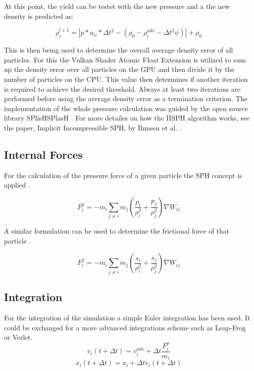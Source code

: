 \documentclass[intern]{cgMA}
\begin{document}
    At this point, the yield can be testet with the new pressure and a the new density is predicted as:

    \begin{equation}
        \rho_i^{l+1} = |p * a_{ii} * \Delta t^2 - (\rho_0 - \rho_i^{adv} - \Delta t^2 \psi)| + \rho_0
    \end{equation}

    This is then being used to determine the overall average density error of all particles. For this the Vulkan Shader Atomic Float Extension is utilized to sum up the density error over all particles on the GPU and then divide it by the number of particles on the CPU. This value then determines if another iteration is required to achieve the desired threshold. Always at least two iterations are performed before using the average density error as a termination criterion. The implementation of the whole pressure calculation was guided by the open source library SPlisHSPlasH \cite{splishsplash}. For more detailes on how the IISPH algorithm works, see the paper, Implicit Incompressible SPH, by Ihmsen et al. \cite{6570475}.

    \subsection{Internal Forces}
    
    For the calculation of the pressure force of a given particle the SPH concept is applied \cite{10.2312:PE:vriphys:vriphys12:053-060}. 

    \begin{equation}
        F_i^p = -m_i \sum_{j \neq i} m_j (\frac{p_i}{\rho_i^2} + \frac{p_j}{\rho_j^2})  \nabla W_{ij}
    \end{equation}
    
    A similar formulation can be used to determine the frictional force of that particle \cite{10.2312:PE:vriphys:vriphys12:053-060}.

    \begin{equation}
        F_i^f = -m_i \sum_{j \neq i} m_j (\frac{s_i}{\rho_i^2} + \frac{s_j}{\rho_j^2})  \nabla W_{ij}
    \end{equation}

    

    \subsection{Integration}
    For the integration of the simulation a simple Euler integration has been used. It could be exchanged for a more advanced integrations scheme such as Leap-Frog or Verlet.
    \begin{equation}
        v_i(t + \Delta t) = v_i^{adv} + \Delta t \frac{F_i^p}{m_i}
    \end{equation}
    \begin{equation}
        x_i(t + \Delta t) = x_i + \Delta t v_i(t + \Delta t)
    \end{equation}
\end{document}
